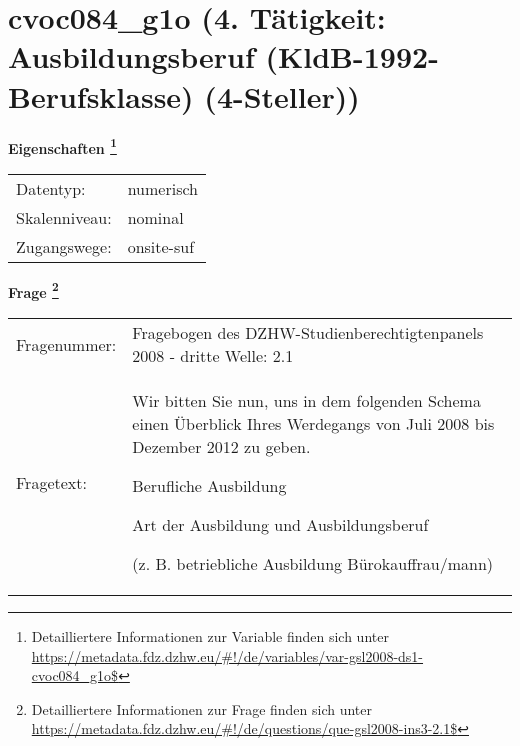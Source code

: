 
    \setcounter{footnote}{0}

    \vspace*{-1.8cm}
	\section{cvoc084\_g1o (4. Tätigkeit: Ausbildungsberuf (KldB-1992-Berufsklasse) (4-Steller))}
	\label{section:cvoc084_g1o}



    \vspace*{0.5cm}
    \noindent\textbf{Eigenschaften
	\footnote{Detailliertere Informationen zur Variable finden sich unter
		\url{https://metadata.fdz.dzhw.eu/\#!/de/variables/var-gsl2008-ds1-cvoc084_g1o$}}}\\
	\begin{tabularx}{\hsize}{@{}lX}
	Datentyp: & numerisch \\
	Skalenniveau: & nominal \\
	Zugangswege: &
	  onsite-suf
 \\
    \end{tabularx}



				\vspace*{0.5cm}
                \noindent\textbf{Frage
	                \footnote{Detailliertere Informationen zur Frage finden sich unter
		              \url{https://metadata.fdz.dzhw.eu/\#!/de/questions/que-gsl2008-ins3-2.1$}}}\\
				\begin{tabularx}{\hsize}{@{}lX}
					Fragenummer: &
					  Fragebogen des DZHW-Studienberechtigtenpanels 2008 - dritte Welle:
					  2.1
 \\
					Fragetext: & Wir bitten Sie nun, uns in dem folgenden Schema einen Überblick Ihres Werdegangs von Juli 2008 bis Dezember 2012 zu geben.\par  Berufliche Ausbildung\par  Art der Ausbildung und Ausbildungsberuf\par  (z. B. betriebliche Ausbildung Bürokauffrau/mann) \\
				\end{tabularx}





